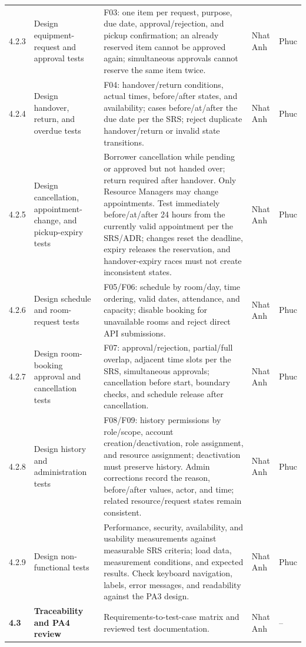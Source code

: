 \documentclass[11pt]{article}
\begin{document}
\begin{longtable}{@{}L{1.15cm}L{3.2cm}L{7.6cm}L{1.4cm}L{1.4cm}@{}}
4.2.3 & Design equipment-request and approval tests & F03: one item per request, purpose, due date, approval/rejection, and pickup confirmation; an already reserved item cannot be approved again; simultaneous approvals cannot reserve the same item twice. & Nhat Anh & Phuc \\
4.2.4 & Design handover, return, and overdue tests & F04: handover/return conditions, actual times, before/after states, and availability; cases before/at/after the due date per the SRS; reject duplicate handover/return or invalid state transitions. & Nhat Anh & Phuc \\
4.2.5 & Design cancellation, appointment-change, and pickup-expiry tests & Borrower cancellation while pending or approved but not handed over; return required after handover. Only Resource Managers may change appointments. Test immediately before/at/after 24 hours from the currently valid appointment per the SRS/ADR; changes reset the deadline, expiry releases the reservation, and handover-expiry races must not create inconsistent states. & Nhat Anh & Phuc \\
4.2.6 & Design schedule and room-request tests & F05/F06: schedule by room/day, time ordering, valid dates, attendance, and capacity; disable booking for unavailable rooms and reject direct API submissions. & Nhat Anh & Phuc \\
4.2.7 & Design room-booking approval and cancellation tests & F07: approval/rejection, partial/full overlap, adjacent time slots per the SRS, simultaneous approvals; cancellation before start, boundary checks, and schedule release after cancellation. & Nhat Anh & Phuc \\
4.2.8 & Design history and administration tests & F08/F09: history permissions by role/scope, account creation/deactivation, role assignment, and resource assignment; deactivation must preserve history. Admin corrections record the reason, before/after values, actor, and time; related resource/request states remain consistent. & Nhat Anh & Phuc \\
4.2.9 & Design non-functional tests & Performance, security, availability, and usability measurements against measurable SRS criteria; load data, measurement conditions, and expected results. Check keyboard navigation, labels, error messages, and readability against the PA3 design. & Nhat Anh & Phuc \\
\textbf{4.3} & \textbf{Traceability and PA4 review} & Requirements-to-test-case matrix and reviewed test documentation. & Nhat Anh & -- \\

\end{longtable}
\end{document}
